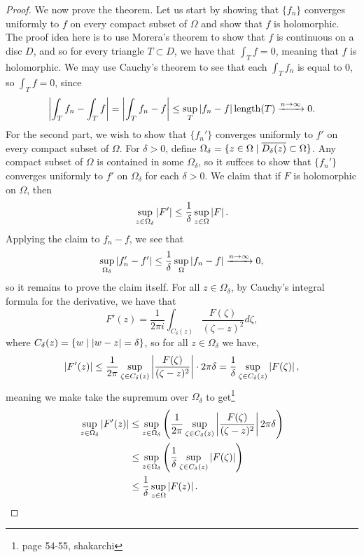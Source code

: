 \begin{proof}
    We now prove the theorem. Let us start by showing that $\{f_n\}$ converges uniformly to $f$ on every compact subset of $\Omega$ and show that $f$ is holomorphic. The proof idea here is to use Morera's theorem to show that $f$ is continuous on a disc $D$, and so for every triangle $T \subset D$, we have that $\int_T f = 0$, meaning that $f$ is holomorphic. We may use Cauchy's theorem to see that each $\int_T f_n$ is equal to $0$, so $\int_T f = 0$, since
    \[ \left\lvert \int_T f_n - \int_T f \right\rvert = \left\lvert \int_T f_n - f \right\rvert \leq \sup_T \left\lvert f_n - f \right\rvert \operatorname{length}(T) \xrightarrow{n \to \infty} 0. \]
    For the second part, we wish to show that $\{f_n'\}$ converges uniformly to $f'$ on every compact subset of $\Omega$. For $\delta > 0$, define $\Omega_\delta = \{z \in \Omega \mid \overline{D_\delta(z)} \subset \Omega\}$. Any compact subset of $\Omega$ is contained in some $\Omega_\delta$, so it suffces to show that $\{f_n'\}$ converges uniformly to $f'$ on $\Omega_\delta$ for each $\delta > 0$. We claim that if $F$ is holomorphic on $\Omega$, then
    \[ \sup_{z \in \Omega_\delta} \left\lvert F' \right\rvert \leq \frac{1}{\delta} \sup_{z \in \Omega} \left\lvert F \right\rvert. \]
    Applying the claim to $f_n - f$, we see that
    \[ \sup_{\Omega_\delta} \left\lvert f_n' - f' \right\rvert \leq \frac{1}{\delta} \sup_\Omega \left\lvert f_n - f \right\rvert \xrightarrow{n \to \infty} 0, \]
    so it remains to prove the claim itself. For all $z \in \Omega_\delta$, by Cauchy's integral formula for the derivative, we have that
    \[ F'(z) = \frac{1}{2\pi i} \int_{C_\delta(z)} \frac{F(\zeta)}{(\zeta - z)^2} d\zeta, \]
    where $C_\delta(z) = \{w \mid \left\lvert w-z \right\rvert=\delta\}$, so for all $z \in \Omega_\delta$ we have,
    \[ \left\lvert F'(z) \right\rvert \leq \frac{1}{2\pi} \sup_{\zeta \in C_\delta(z)} \left\lvert \frac{F(\zeta)}{(\zeta - z)^2} \right\rvert \cdot 2\pi \delta = \frac{1}{\delta} \sup_{\zeta \in C_\delta(z)} \left\lvert F(\zeta) \right\rvert, \]
    meaning we make take the supremum over $\Omega_\delta$ to get\footnote{page 54-55, shakarchi}
    \begin{align*}
        \sup_{z \in \Omega_\delta} \left\lvert F'(z) \right\rvert &\leq \sup_{z \in \Omega_\delta} \left(\frac{1}{2\pi} \sup_{\zeta \in C_\delta(z)} \left\lvert \frac{F(\zeta)}{(\zeta - z)^2} \right\rvert 2 \pi \delta\right) \\
        &\leq \sup_{z \in \Omega_\delta} \left(\frac{1}{\delta} \sup_{\zeta \in C_\delta(z)} \left\lvert F(\zeta) \right\rvert \right) \\
        &\leq \frac{1}{\delta} \sup_{z \in \Omega} \left\lvert F(z) \right\rvert. \qedhere
    \end{align*}
\end{proof}

